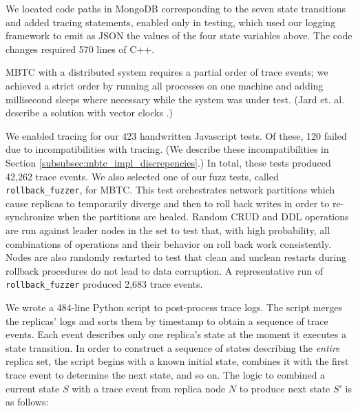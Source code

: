 \documentclass{vldb}
\begin{document}
We located code paths in MongoDB corresponding to the seven state transitions and added tracing statements, enabled only in testing, which used our logging framework to emit as JSON the values of the four state variables above. 
The code changes required 570 lines of C++.

MBTC with a distributed system requires a partial order of trace events; we achieved a strict order by running all processes on one machine and adding millisecond sleeps where necessary while the system was under test. 
(Jard et. al. describe a solution with vector clocks \cite{Jard94GeneralApproachToTraceChecking}.)


We enabled tracing for our 423 handwritten Javascript tests. 
Of these, 120 failed due to incompatibilities with tracing. 
(We describe these incompatibilities in Section \ref{subsubsec:mbtc_impl_discrepencies}.)
In total, these tests produced 42,262 trace events. 
We also selected one of our fuzz tests, called \texttt{rollback\_fuzzer}, for MBTC. 
This test orchestrates network partitions which cause replicas to temporarily diverge and then to roll back writes in order to re-synchronize when the partitions are healed.
Random CRUD and DDL operations are run against leader nodes in the set to test that, with high probability, all combinations of operations and their behavior on roll back work consistently.
Nodes are also randomly restarted to test that clean and unclean restarts during rollback procedures do not lead to data corruption.
A representative run of \texttt{rollback\_fuzzer} produced 2,683 trace events.

We wrote a 484-line Python script \cite{ReplTraceChecker} to post-process trace logs. 
The script merges the replicas' logs and sorts them by timestamp to obtain a sequence of trace events. 
Each event describes only one replica's state at the moment it executes a state transition.
In order to construct a sequence of states describing the \textit{entire} replica set, 
the script begins with a known initial state, combines it with the first trace event to determine the next state, and so on. 
The logic to combined a current state \ensuremath{S} with a trace event from replica node \ensuremath{N} to produce next state \ensuremath{S'} is as follows:
\end{document}
